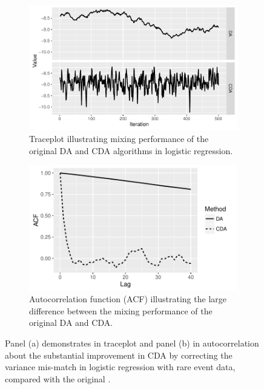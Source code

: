 \documentclass[10pt]{article}
\begin{document}
\begin{figure}[H]
  \begin{subfigure}[b]{0.49\textwidth}
 \includegraphics[width=1\textwidth]{logit_random_trace_plot.pdf}
  \caption{Traceplot illustrating mixing performance of the original DA and CDA algorithms in logistic regression.}
\end{subfigure}
  \hfill
   \begin{subfigure}[b]{0.49\textwidth}
 \includegraphics[width=1\textwidth]{logit_random_acf.pdf}
  \caption{Autocorrelation function (ACF) illustrating the large difference between the mixing performance of the original DA and CDA.}
\end{subfigure}
 \caption{Panel (a) demonstrates in traceplot and panel (b) in autocorrelation about the substantial improvement in CDA by correcting the variance mis-match in logistic regression with rare event data, compared with the original \citep{polson2013bayesian}.}
    \label{logit_random_mixing}
 \end{figure}
 
\end{document}
